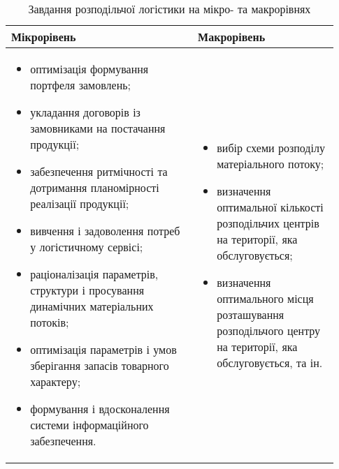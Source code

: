 \begin{table}[H]
	\caption{Завдання розподільчої логістики на мікро- та макрорівнях}
	\label{tab:logistic_functions}
	\begin{tabular}{@{}|p{0.53\linewidth}|p{0.4\linewidth}|@{}}
	 	\hline
		Мікрорівень & Макрорівень \\ \hline
		\begin{itemize}[leftmargin=*]
			\item оптимізація формування портфеля замовлень;
			\item укладання договорів із замовниками на постачання продукції;
			\item забезпечення ритмічності та дотримання планомірності реалізації продукції;
			\item вивчення і задоволення потреб у логістичному сервісі;
			\item раціоналізація параметрів, структури і просування динамічних матеріальних потоків;
			\item оптимізація параметрів і умов зберігання запасів товарного характеру;
			\item формування і вдосконалення системи інформаційного забезпечення.
		\end{itemize}
		&
		\begin{itemize}[leftmargin=*]
			\item вибір схеми розподілу матеріального потоку;
			\item визначення оптимальної кількості розподільчих центрів на території, яка обслуговується;
			\item визначення оптимального місця розташування розподільчого центру на території, яка обслуговується, та ін.
		\end{itemize} \\ \hline
	\end{tabular}
\end{table}

